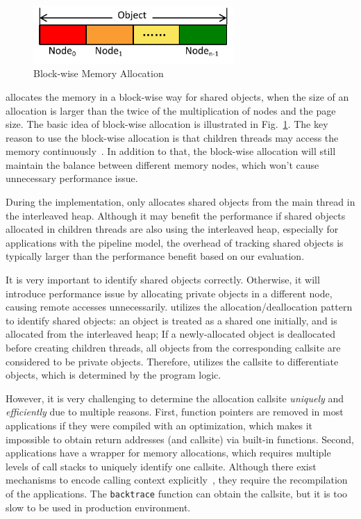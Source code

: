 \begin{figure}
\centering
\includegraphics[width=3in]{figure/blockwise}
\vspace{-0.1in}
\caption{Block-wise Memory Allocation\label{fig:blockwise}}
\vspace{-0.1in}
\end{figure}
\NA{} allocates the memory in a block-wise way for shared objects, when the size of an allocation is larger than the twice of the multiplication of nodes and the page size. The basic idea of block-wise allocation is illustrated in Fig.~\ref{fig:blockwise}. The key reason to use the block-wise allocation is that children threads may access the memory continuously~\cite{XULIU}. In addition to that, the block-wise allocation will still maintain the balance between different memory nodes, which won't cause unnecessary performance issue. 
 
During the implementation, \NA{} only allocates shared objects from the main thread in the interleaved heap. Although it may benefit the performance if shared objects allocated in children threads are also using the interleaved heap, especially for applications with the pipeline model, the overhead of tracking shared objects is typically larger than the performance benefit based on our evaluation. 

It is very important to identify shared objects correctly. Otherwise, it will introduce performance issue by allocating private objects in a different node, causing remote accesses unnecessarily. \NA{} utilizes the allocation/deallocation pattern to identify shared objects: an object is treated as a shared one initially, and is allocated from the interleaved heap; If a newly-allocated object is deallocated before creating children threads, all objects from the corresponding callsite are considered to be private objects. Therefore, \NA{} utilizes the callsite to differentiate objects, which is determined by the program logic.  

However, it is very challenging to determine the allocation callsite \textit{uniquely} and \textit{efficiently} due to multiple reasons. First, function pointers are removed in most applications if they were compiled with an optimization, which makes it impossible to obtain return addresses (and callsite) via built-in functions. Second, applications have a wrapper for memory allocations, which requires multiple levels of call stacks to uniquely identify one callsite. Although there exist mechanisms to encode calling context explicitly~\cite{DBLP:conf/icse/SumnerZWZ10, DBLP:conf/cgo/ZengR0AJ014}, they require the recompilation of the applications. The \texttt{backtrace} function can obtain the callsite, but it is too slow to be used in production environment.

